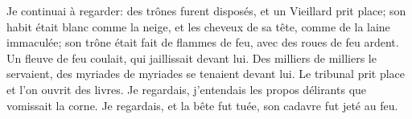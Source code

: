 Je continuai à regarder:
	des trônes furent disposés, et un Vieillard prit place;
	son habit était blanc comme la neige,
	et les cheveux de sa tête, comme de la laine immaculée;
	son trône était fait de flammes de feu, avec des roues de feu ardent.
Un fleuve de feu coulait, qui jaillissait devant lui.
Des milliers de milliers le servaient,
	des myriades de myriades se tenaient devant lui.
Le tribunal prit place et l’on ouvrit des livres.
Je regardais, j’entendais les propos délirants que vomissait la corne.
	Je regardais, et la bête fut tuée, son cadavre fut jeté au feu.
